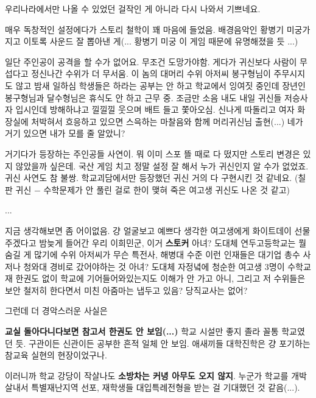 우리나라에서만 나올 수 있었던 걸작인 게 아니라 다시 나와서 기쁘네요.
\vspace{5mm}

매우 독창적인 설정에다가 스토리 철학이 꽤 마음에 들었음.
배경음악인 황병기 미궁가지고 이토록 사운드 잘 뽑아낸 게(... 황병기 미궁 이 게임 때문에 유명해졌을 듯 ...)
\vspace{5mm}

일단 주인공이 공격을 할 수가 없어요. 무조건 도망가야함. 게다가 귀신보다 사람이 무섭다고 정신나간 수위가 더 무서움.
이 놈의 대머리 수위 아저씨 봉구형님이 주무시지도 않고 밤새 일하심
학생들은 하라는 공부는 안 하고 학교에서 잉여짓 중인데 장년인 봉구형님과 달수형님은 휴식도 안 하고 근무 중.
조금만 소음 내도 내일 귀신들 저승사자 입시인데 방해하냐고 낄낄낄 웃으며 배트 들고 쫓아오심.
신나게 따돌리고 여자 화장실에 처박혀서 흐응하고 있으면 스윽하는 마찰음와 함께 머리귀신님 출현(...)
네가 거기 있으면 내가 모를 줄 알았니?
\vspace{5mm}

거기다가 등장하는 주인공들 사연이. 뭐 이미 스포 뜰 때로 다 떴지만 스토리 변경은 있지 않았을까 싶은데.
국산 게임 치고 정말 설정 잘 해서 누가 귀신인지 알 수가 없었죠.귀신 사연도 참 불쌍.
학교괴담에서만 등장했던 귀신 거의 다 구현시킨 것 같네요.
(칠판 귀신 $-$ 수학문제가 안 풀린 걸로 한이 맺혀 죽은 여고생 귀신도 나온 것 같고)
\vspace{5mm}

...
\vspace{5mm}

지금 생각해보면 좀 어이없음.
걍 얼굴보고 예쁘다 생각한 여고생에게 화이트데이 선물주겠다고 밤늦게 들어간 우리 이희민군, 이거 \textbf{스토커} 아녀?
도대체 연두고등학교는 뭘 숨길 게 많기에 수위 아저씨가 무슨 특전사, 해병대 수준
이런 인재들은 대기업 총수 사저나 청와대 경비로 갔어야하는 것 아녀?
도대체 자정녘에 청순한 여고생 3명이 수학교재 한권도 없이 학교에 기어들어와있는지도 이해가 안 가고
아니, 그리고 저 수위들은 보안 철저히 한다면서 미친 아줌마는 냅두고 있음?
당직교사는 없어?
\vspace{5mm}

그런데 더 경악스러운 사실은
\vspace{5mm}

\textbf{교실 돌아다니다보면 참고서 한권도 안 보임(...)}
학교 시설만 좋지 졸라 꼴통 학교였던 듯. 구관이든 신관이든 공부한 흔적 일체 안 보임.
애새끼들 대학진학은 걍 포기하는 참교육 실현의 현장이었구나.
\vspace{5mm}

이러니까 학교 강당이 작살나도 \textbf{소방차는 커녕 아무도 오지 않지}.
누군가 학교를 개박살내서 특별재난지역 선포, 재학생들 대입특례전형을 받는 걸 기대했던 것 같음(...).
\vspace{5mm}

